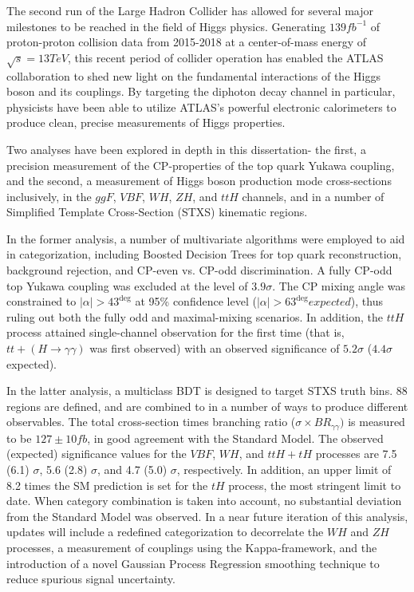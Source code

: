 The second run of the Large Hadron Collider has allowed for several major milestones to be reached in the field of Higgs physics. Generating $139 fb^{-1}$ of proton-proton collision data from 2015-2018 at a center-of-mass energy of $\sqrt{s} = 13 TeV$, this recent period of collider operation has enabled the ATLAS collaboration to shed new light on the fundamental interactions of the Higgs boson and its couplings. By targeting the diphoton decay channel in particular, physicists have been able to utilize ATLAS's powerful electronic calorimeters to produce clean, precise measurements of Higgs properties.

Two analyses have been explored in depth in this dissertation- the first, a precision measurement of the CP-properties of the top quark Yukawa coupling, and the second, a measurement of Higgs boson production mode cross-sections inclusively, in the $ggF$, $VBF$, $WH$, $ZH$, and $ttH$ channels, and in a number of Simplified Template Cross-Section (STXS) kinematic regions.

In the former analysis, a number of multivariate algorithms were employed to aid in categorization, including Boosted Decision Trees for top quark reconstruction, background rejection, and CP-even vs. CP-odd discrimination. A fully CP-odd top Yukawa coupling was excluded at the level of $3.9 \sigma$. The CP mixing angle was constrained to $|\alpha| > 43^{\deg}$ at 95\% confidence level ($|\alpha| > 63^{\deg} expected$), thus ruling out both the fully odd and maximal-mixing scenarios. In addition, the $ttH$ process attained single-channel observation for the first time (that is, $tt+(H \rightarrow \gamma \gamma)$ was first observed) with an observed significance of $5.2 \sigma$ ($4.4 \sigma$ expected). 

In the latter analysis, a multiclass BDT is designed to target STXS truth bins. 88 regions are defined, and are combined to in a number of ways to produce different observables. The total cross-section times branching ratio ($\sigma \times BR_{\gamma \gamma})$ is measured to be $127\pm 10 fb$, in good agreement with the Standard Model. The observed (expected) significance values for the $VBF$, $WH$, and $ttH+tH$ processes are 7.5 (6.1) $\sigma$, 5.6 (2.8) $\sigma$, and 4.7 (5.0) $\sigma$, respectively. In addition, an upper limit of 8.2 times the SM prediction is set for the $tH$ process, the most stringent limit to date. When category combination is taken into account, no substantial deviation from the Standard Model was observed. In a near future iteration of this analysis, updates will include a redefined categorization to decorrelate the $WH$ and $ZH$ processes, a measurement of couplings using the Kappa-framework, and the introduction of a novel Gaussian Process Regression smoothing technique to reduce spurious signal uncertainty.

